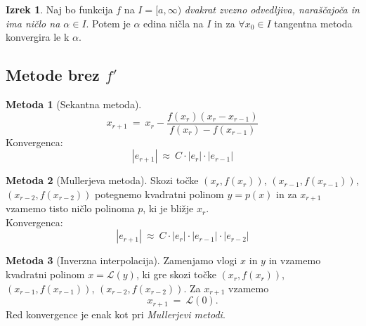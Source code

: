 \documentclass[11pt]{article}
\theoremstyle{definition}
\newtheorem{izrek}{Izrek}
\newtheorem*{metoda}{Metoda}
\begin{document}
\begin{izrek}

Naj bo funkcija $f$ na $I = [a, \infty)$ \textit{dvakrat zvezno odvedljiva, naraščajoča in ima ničlo na $\alpha \in I$}. Potem je $\alpha$ edina ničla na $I$ in za $\forall x_0 \in I$ tangentna metoda konvergira le k $\alpha$.

\end{izrek}
\vspace{0.5cm}


\subsection{Metode brez $f'$}
\vspace{0.5cm}


\begin{metoda}[Sekantna metoda]

$$x_{r+1} ~=~ x_r - \frac{f(x_r)(x_r - x_{r-1})}{f(x_r) - f(x_{r-1})}$$
Konvergenca:
$$|e_{r+1}| ~\approx~ C \cdot |e_r| \cdot |e_{r-1}|$$

\end{metoda}
\vspace{0.5cm}

\begin{metoda}[Mullerjeva metoda]

Skozi točke $(x_r, f(x_r))$, $(x_{r-1}, f(x_{r-1}))$, \\$(x_{r-2}, f(x_{r-2}))$ potegnemo kvadratni polinom $y = p(x)$ in za $x_{r+1}$ vzamemo tisto ničlo polinoma $p$, ki je bližje $x_r$. \\

\noindent Konvergenca:
$$|e_{r+1}| ~\approx~ C \cdot |e_r| \cdot |e_{r-1}| \cdot |e_{r-2}|$$

\end{metoda}
\vspace{0.5cm}

\begin{metoda}[Inverzna interpolacija]

Zamenjamo vlogi $x$ in $y$ in vzamemo kvadratni polinom $x = \mathcal{L}(y)$, ki gre skozi točke $(x_r, f(x_r))$, $(x_{r-1}, f(x_{r-1}))$, $(x_{r-2}, f(x_{r-2}))$. Za $x_{r+1}$ vzamemo
$$x_{r+1} ~=~ \mathcal{L}(0).$$
Red konvergence je enak kot pri \textit{Mullerjevi metodi}.

\end{metoda}
\vspace{0.5cm}
\end{document}
